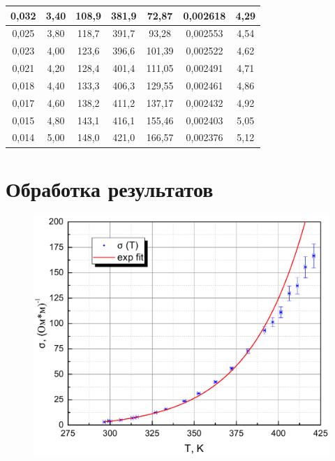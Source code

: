 \documentclass[a4paper,12pt]{article} %
\begin{document}
\begin{table}[H]
\begin{tabular}{|c|c|c|c|c|c|c|}
			0,032    & 3,40    & 108,9          & 381,9  & 72,87                                     & 0,002618        & 4,29         \\ \hline
			0,025    & 3,80    & 118,7          & 391,7  & 93,28                                     & 0,002553        & 4,54         \\ \hline
			0,023    & 4,00    & 123,6          & 396,6  & 101,39                                    & 0,002522        & 4,62         \\ \hline
			0,021    & 4,20    & 128,4          & 401,4  & 111,05                                    & 0,002491        & 4,71         \\ \hline
			0,018    & 4,40    & 133,3          & 406,3  & 129,55                                    & 0,002461        & 4,86         \\ \hline
			0,017    & 4,60    & 138,2          & 411,2  & 137,17                                    & 0,002432        & 4,92         \\ \hline
			0,015    & 4,80    & 143,1          & 416,1  & 155,46                                    & 0,002403        & 5,05         \\ \hline
			0,014    & 5,00    & 148,0          & 421,0  & 166,57                                    & 0,002376        & 5,12         \\ \hline
		\end{tabular}
	\end{table}
	
	
	
	\newpage
	\section{Обработка результатов}
		\begin{figure}[h!]
			\begin{floatrow}
				{\includegraphics[scale=0.5]{graph1.pdf}}    
			\end{floatrow}
		\end{figure}
	
\end{document}
